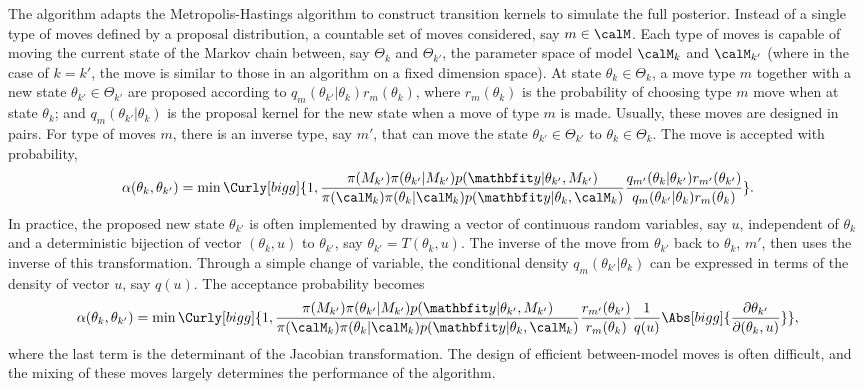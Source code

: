The \rjmcmc algorithm adapts the Metropolis-Hastings algorithm to construct transition kernels to simulate the full posterior. Instead of a single type of moves defined by a proposal distribution, a countable set of moves  considered, say $m\in\calM$. Each type of moves is capable of moving the current state of the Markov chain between, say $\Theta_k$ and $\Theta_{k'}$, the parameter space of model $\calM_k$ and $\calM_{k'}$ (where in the case of $k = k'$, the move is similar to those in an \mcmc algorithm on a fixed dimension space). At state $\theta_k\in\Theta_k$, a move  type $m$ together with a new state $\theta_{k'}\in\Theta_{k'}$ are proposed according to $q_m(\theta_{k'}|\theta_k)r_m(\theta_k)$, where $r_m(\theta_k)$ is the probability of choosing  type $m$ move when at state $\theta_k$; and $q_m(\theta_{k'}|\theta_k)$ is the proposal kernel for the new state when a move of type $m$ is made. Usually, these moves are designed in pairs. For type of moves $m$, there is an inverse type, say $m'$, that can move the state $\theta_{k'}\in\Theta_{k'}$ to $\theta_k\in\Theta_k$. The move is accepted with probability,
\begin{equation}
  \alpha(\theta_k,\theta_{k'}) =
  \min\Curly[bigg]{1,
    \frac{\pi(M_{k'})\pi(\theta_{k'}|M_{k'})p(\data|\theta_{k'},M_{k'})}
    {\pi(\calM_k)\pi(\theta_k|\calM_k)p(\data|\theta_k,\calM_k)}
    \frac{q_{m'}(\theta_k|\theta_{k'})r_{m'}(\theta_{k'})}
    {q_m(\theta_{k'}|\theta_k)r_m(\theta_k)}
  }.
\end{equation}
In practice, the proposed new state $\theta_{k'}$ is often implemented by drawing a vector of continuous random variables, say $u$, independent of $\theta_k$ and a deterministic bijection of vector $(\theta_k,u)$ to $\theta_{k'}$, say $\theta_{k'} = T(\theta_k,u)$. The inverse of the move from $\theta_{k'}$ back to $\theta_k$, $m'$, then uses the inverse of this transformation. Through a simple change of variable, the conditional density $q_m(\theta_{k'}|\theta_k)$ can be expressed in terms of the density of vector $u$, say $q(u)$. The acceptance probability becomes
\begin{equation}
  \alpha(\theta_k,\theta_{k'}) =
  \min\Curly[bigg]{1,
    \frac{\pi(M_{k'})\pi(\theta_{k'}|M_{k'})p(\data|\theta_{k'},M_{k'})}
    {\pi(\calM_k)\pi(\theta_k|\calM_k)p(\data|\theta_k,\calM_k)}
    \frac{r_{m'}(\theta_{k'})}{r_m(\theta_k)}
    \frac{1}{q(u)}\Abs[bigg]{\frac{\partial\theta_{k'}}{\partial(\theta_k,u)}}
  },
\end{equation}
where the last term is the determinant of the Jacobian transformation. The design of efficient between-model moves is often difficult, and the mixing of these moves largely determines the performance of the algorithm.


